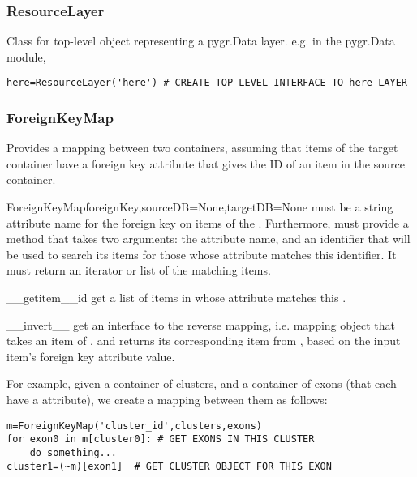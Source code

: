 \documentclass{howto}
\begin{document}
\subsubsection{ResourceLayer}
Class for top-level object representing a pygr.Data layer.  e.g. in the pygr.Data
module,
\begin{verbatim}
here=ResourceLayer('here') # CREATE TOP-LEVEL INTERFACE TO here LAYER
\end{verbatim}

\subsubsection{ForeignKeyMap}
Provides a mapping between two containers, assuming that items of the target
container have a foreign key attribute that gives the ID of an item in the source
container.
\begin{funcdesc}{ForeignKeyMap}{foreignKey,sourceDB=None,targetDB=None}
   must be a string attribute name for the foreign key on
  items of the .  Furthermore,  must provide
  a  method that takes two arguments: the  attribute name,
  and an identifier that will be used to search its items for those whose attribute
  matches this identifier.  It must return an iterator or list of the matching items.
\end{funcdesc}

\begin{funcdesc}{__getitem__}{id}
  get a list of items in  whose attribute matches this .
\end{funcdesc}

\begin{funcdesc}{__invert__}{}
  get an interface to the reverse mapping, i.e. mapping object that takes an
  item of , and returns its corresponding item from ,
  based on the input item's foreign key attribute value.
\end{funcdesc}

For example, given a container of clusters, and a container of exons (that each
have a  attribute), we create a mapping between them as follows:
\begin{verbatim}
m=ForeignKeyMap('cluster_id',clusters,exons)
for exon0 in m[cluster0]: # GET EXONS IN THIS CLUSTER
    do something...
cluster1=(~m)[exon1]  # GET CLUSTER OBJECT FOR THIS EXON
\end{verbatim}
\end{document}
